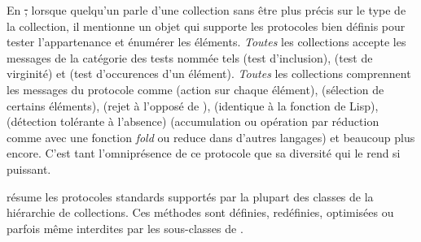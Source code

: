 \documentclass[a4paper,10pt,twoside]{book}
\begin{document}
En \st, lorsque quelqu'un parle d'une collection sans \^etre plus pr\'ecis
sur le type de la collection, il mentionne un objet qui supporte les protocoles
bien d\'efinis pour tester l'appartenance et \'enum\'erer les \'el\'ements.
\emph{Toutes} les collections accepte les messages 
de la cat\'egorie des tests nomm\'ee  tels 
\mbox{} (test d'inclusion),  (test de virginit\'e) 
et \mbox{} (test d'occurences d'un \'el\'ement). 
\emph{Toutes} les collections comprennent les messages du protocole 
 comme 
 (action sur chaque \'el\'ement), 
 (s\'election de certains \'el\'ements), 
 (rejet \`a l'oppos\'e de ), 
 (identique \`a la fonction  de Lisp),
 (d\'etection tol\'erante \`a l'absence) 
 (accumulation ou op\'eration par r\'eduction 
comme avec une fonction \emph{fold} ou reduce dans d'autres langages) et
beaucoup plus encore.
C'est tant l'omnipr\'esence de ce protocole que sa diversit\'e qui le rend
si puissant.

 r\'esume les protocoles standards support\'es par la
plupart des classes de la hi\'erarchie de collections. 
Ces m\'ethodes sont d\'efinies, red\'efinies, optimis\'ees ou parfois
m\^eme interdites par les sous-classes de 
.
\end{document}
